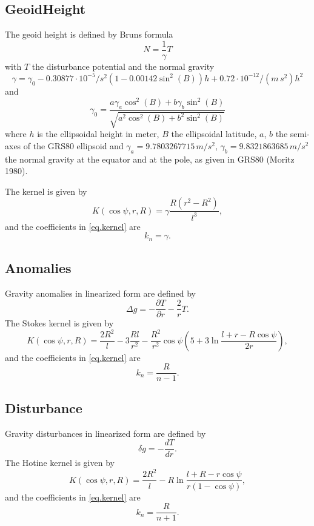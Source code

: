 \subsection{GeoidHeight}\label{kernelType:geoidHeight}
The geoid height is defined by Bruns formula
\begin{equation}
N = \frac{1}{\gamma}T
\end{equation}
with $T$ the disturbance potential and the normal gravity
\begin{equation}\label{normalgravity}
  \gamma  = \gamma_0 - 0.30877\cdot 10^{-5}/s^2(1-0.00142\sin^2(B))h + 0.72\cdot 10^{-12}/(m\,s^2)h^2
\end{equation}
and
\begin{equation}
  \gamma_0 = \frac{a\gamma_a\cos^2(B)+b\gamma_b\sin^2(B)}{\sqrt{a^2\cos^2(B)+b^2\sin^2(B)}}
\end{equation}
where $h$ is the ellipsoidal height in meter, $B$ the ellipsoidal latitude,
$a$, $b$ the semi-axes of the GRS80 ellipsoid and $\gamma_a=9.7803267715\,m/s^2$,
$\gamma_b=9.8321863685\,m/s^2$ the normal gravity at the equator and at the
pole, as given in GRS80 (Moritz 1980).

The kernel is given by
\begin{equation}
K(\cos\psi,r,R) = \gamma\frac{R(r^2-R^2)}{l^3},
\end{equation}
and the coefficients in \eqref{eq.kernel} are
\begin{equation}
k_n = \gamma.
\end{equation}


\subsection{Anomalies}
Gravity anomalies in linearized form are defined by
\begin{equation}
\Delta g = -\frac{\partial T}{\partial r}-\frac{2}{r}T.
\end{equation}
The Stokes kernel is given by
\begin{equation}
K(\cos\psi,r,R) = \frac{2R^2}{l}-3\frac{Rl}{r^2}-\frac{R^2}{r^2}\cos\psi
\left(5+3\ln\frac{l+r-R\cos\psi}{2r}\right),
\end{equation}
and the coefficients in \eqref{eq.kernel} are
\begin{equation}
k_n = \frac{R}{n-1}.
\end{equation}


\subsection{Disturbance}\label{kernelType:disturbance}
Gravity disturbances in linearized form are defined by
\begin{equation}
\delta g = -\frac{dT}{dr}.
\end{equation}
The Hotine kernel is given by
\begin{equation}
K(\cos\psi,r,R) = \frac{2R^2}{l}-R\ln\frac{l+R-r\cos\psi}{r(1-\cos\psi)},
\end{equation}
and the coefficients in \eqref{eq.kernel} are
\begin{equation}
k_n = \frac{R}{n+1}.
\end{equation}


